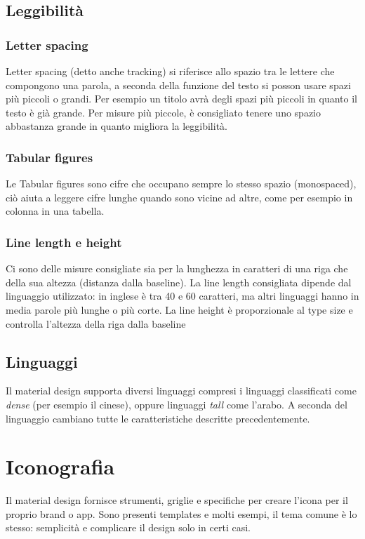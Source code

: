 \documentclass[12pt, a4paper]{report}
\begin{document}
	\subsection{Leggibilità}
		\subsubsection{Letter spacing}
			Letter spacing (detto anche tracking) si riferisce allo spazio tra le lettere che compongono una parola, a seconda della funzione del testo si posson usare spazi più piccoli o grandi.
			Per esempio un titolo avrà degli spazi più piccoli in quanto il testo è già grande. Per misure più piccole, è consigliato tenere uno spazio abbastanza grande in quanto migliora la leggibilità.
		\subsubsection{Tabular figures}
			Le Tabular figures sono cifre che occupano sempre lo stesso spazio (monospaced), ciò aiuta a leggere cifre lunghe quando sono vicine ad altre, come per esempio in colonna in una tabella.
		\subsubsection{Line length e height}
			Ci sono delle misure consigliate sia per la lunghezza in caratteri di una riga che della sua altezza (distanza dalla baseline).
			La line length consigliata dipende dal linguaggio utilizzato: in inglese è tra 40 e 60 caratteri, ma altri linguaggi hanno in media parole più lunghe o più corte.
			La line height è proporzionale al type size e controlla l'altezza della riga dalla baseline
	\subsection{Linguaggi}
			Il material design supporta diversi linguaggi compresi i linguaggi classificati come \textit{dense} (per esempio il cinese), oppure linguaggi \textit{tall} come l'arabo. A seconda del linguaggio cambiano tutte le caratteristiche descritte precedentemente.










	\section{Iconografia}
		Il material design fornisce strumenti, griglie e specifiche per creare l'icona per il proprio brand o app. Sono presenti templates e molti esempi, il tema comune è lo stesso: semplicità e complicare  il design solo in certi casi.
\end{document}
